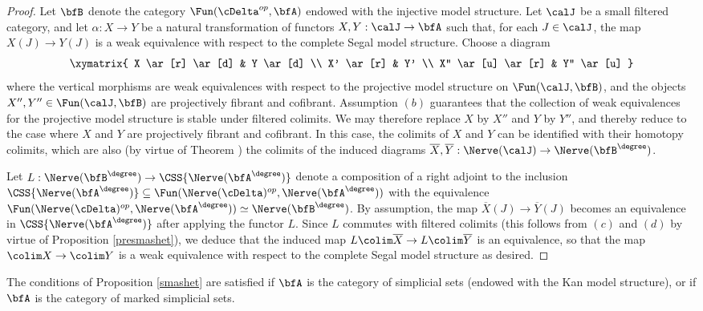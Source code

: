 \begin{proof}
Let $\bfB$ denote the category $\Fun( \cDelta^{op}, \bfA)$ endowed with the
injective model structure. Let $\calJ$ be a small filtered category, and let $\alpha: X \rightarrow Y$ be a natural transformation of functors $X,Y: \calJ \rightarrow \bfA$ such that, for each
$J \in \calJ$, the map $X(J) \rightarrow Y(J)$ is a weak equivalence with respect
to the complete Segal model structure. Choose a diagram
$$ \xymatrix{ X \ar[r] \ar[d] & Y \ar[d] \\
X' \ar[r] & Y' \\
X'' \ar[u] \ar[r] & Y'' \ar[u] }$$
where the vertical morphisms are weak equivalences with respect to the projective model
structure on $\Fun( \calJ, \bfB)$, and the objects $X'', Y'' \in \Fun( \calJ, \bfB)$ are
projectively fibrant and cofibrant. Assumption $(b)$ guarantees that the collection of
weak equivalences for the projective model structure is stable under filtered colimits. We may therefore replace $X$ by $X''$ and $Y$ by $Y''$, and thereby reduce to the case where
$X$ and $Y$ are projectively fibrant and cofibrant. In this case, the colimits of $X$ and $Y$ can be identified with their homotopy colimits, which are also (by virtue of Theorem )
the colimits of the induced diagrams $\overline{X}, \overline{Y}: \Nerve(\calJ) \rightarrow 
\Nerve(\bfB^{\degree})$.

Let $L: \Nerve( \bfB^{\degree}) \rightarrow \CSS{ \Nerve(\bfA^{\degree})}$ denote
a composition of a right adjoint to the inclusion $\CSS{ \Nerve(\bfA^{\degree})} 
\subseteq \Fun( \Nerve(\cDelta)^{op}, \Nerve(\bfA^{\degree}))$ 
with the equivalence $\Fun( \Nerve(\cDelta)^{op}, \Nerve(\bfA^{\degree})) \simeq \Nerve( \bfB^{\degree} )$. By assumption, the map $\overline{X}(J) \rightarrow \overline{Y}(J)$ becomes an
equivalence in $\CSS{ \Nerve(\bfA^{\degree})}$ after applying the functor $L$.
Since $L$ commutes with filtered colimits (this follows from $(c)$ and $(d)$ by virtue of Proposition \ref{presmashet}), we deduce that the induced map $L \colim \overline{X} \rightarrow L \colim \overline{Y}$ is an equivalence, so that the map $\colim X \rightarrow \colim Y$ is a weak equivalence with respect to the complete Segal model structure as desired.
\end{proof}

\begin{example}\label{smashett}
The conditions of Proposition \ref{smashet} are satisfied if $\bfA$ is the category of simplicial sets
(endowed with the Kan model structure), or if $\bfA$ is the category of marked simplicial sets.
\end{example}

